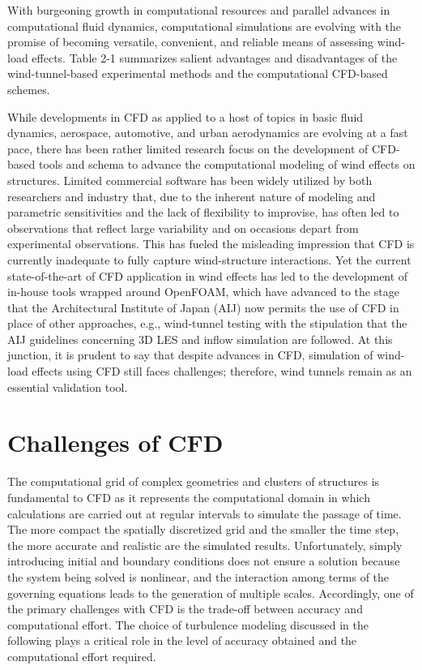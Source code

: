 With burgeoning growth in computational resources and parallel advances in computational fluid dynamics, computational simulations are evolving with the promise of becoming versatile, convenient, and reliable means of assessing wind-load effects. Table 2-1 summarizes salient advantages and disadvantages of the wind-tunnel-based experimental methods and the computational CFD-based schemes.

While developments in CFD as applied to a host of topics in basic fluid dynamics, aerospace, automotive, and urban aerodynamics are evolving at a fast pace, there has been rather limited research focus on the development of CFD-based tools and schema to advance the computational modeling of wind effects on structures. Limited commercial software has been widely utilized by both researchers and industry that, due to the inherent nature of modeling and parametric sensitivities and the lack of flexibility to improvise, has often led to observations that reflect large variability and on occasions depart from experimental observations. This has fueled the misleading impression that CFD is currently inadequate to fully capture wind-structure interactions. Yet the current state-of-the-art of CFD application in wind effects has led to the development of in-house tools wrapped around OpenFOAM, which have advanced to the stage that the Architectural Institute of Japan (AIJ) now permits the use of CFD in place of other approaches, e.g., wind-tunnel testing with the stipulation that the AIJ guidelines concerning 3D LES and inflow simulation are followed. At this junction, it is prudent to say that despite advances in CFD, simulation of wind-load effects using CFD still faces challenges; therefore, wind tunnels remain as an essential validation tool.
 
\section{Challenges of CFD}
\label{sec:resp_cfd_wind_challenges}

The computational grid of complex geometries and clusters of structures is fundamental to CFD as it represents the computational domain in which calculations are carried out at regular intervals to simulate the passage of time. The more compact the spatially discretized grid and the smaller the time step, the more accurate and realistic are the simulated results. Unfortunately, simply introducing initial and boundary conditions does not ensure a solution because the system being solved is nonlinear, and the interaction among terms of the governing equations leads to the generation of multiple scales. Accordingly, one of the primary challenges with CFD is the trade-off between accuracy and computational effort. The choice of turbulence modeling discussed in the following plays a critical role in the level of accuracy obtained and the computational effort required. 

